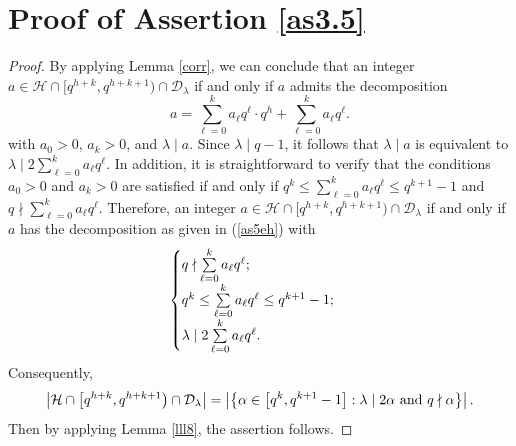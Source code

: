 \documentclass[journal,onecolumn]{IEEEtran}
\begin{document}
\section{Proof of Assertion \ref{as3.5}}\label{APM}
\begin{proof}
 By applying Lemma \ref{corr}, we can conclude that an integer $a\in \mathcal{H}\cap [q^{h+k},q^{h+k+1})\cap \mathcal{D}_{\lambda}$ if and only if 
 $a$ admits the decomposition   \begin{equation}\label{as5eh}
a=\sum\limits_{\ell=0}^{k}a_{\ell}q^{\ell}\cdot  q^{h}+\sum\limits_{\ell=0}^{k}a_{\ell}q^{\ell}.
 \end{equation} 
 with $a_0>0$, $a_{k}>0$, and $\lambda\mid a$. 
 Since $\lambda\mid q-1$, it follows that $\lambda\mid a$ is equivalent to  $\lambda \mid 2\sum\limits_{\ell=0}^{k}a_{\ell}q^{\ell}$. In addition, it is straightforward to verify that the conditions $a_{0}>0$ and $a_{k}>0$ are satisfied if and only if $q^k\leq \sum\limits_{\ell=0}^{k}a_{\ell}q^{\ell} \leq q^{k+1}-1$ and $q\nmid \sum\limits_{\ell=0}^{k}a_{\ell}q^{\ell}$. Therefore,   an integer $a\in \mathcal{H}\cap [q^{h+k},q^{h+k+1})\cap \mathcal{D}_{\lambda}$ if and only if $a$ has the decomposition as given in  (\ref{as5eh})
 with 
 \begin{equation}\notag
     \begin{cases}
     q\nmid \sum\limits_{\ell=0}^{k}a_{\ell}q^{\ell};\\
     q^k\leq \sum\limits_{\ell=0}^{k}a_{\ell}q^{\ell}\leq q^{k+1}-1;\\
         \lambda \mid 2\sum\limits_{\ell=0}^{k}a_{\ell}q^{\ell}.
     \end{cases}
 \end{equation}
Consequently, 
 \begin{equation}\notag
     \left|\mathcal{H}\cap \left[q^{h+k},q^{h+k+1}\right)\cap \mathcal{D}_{\lambda}\right| =\left| \left\{ \alpha \in \left[q^k, q^{k+1}-1\right]: \lambda\mid 2\alpha \hbox{ and }q \nmid \alpha\right\}\right|.
 \end{equation} 
Then by applying Lemma \ref{lll8},  the assertion follows.  
 \end{proof}
    
\end{document}

